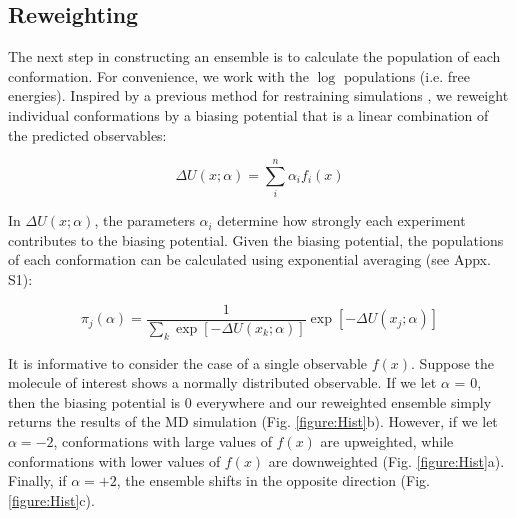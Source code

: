 \documentclass[journal=jacsat,manuscript=article]{achemso}
\begin{document}
\subsection{Reweighting}

The next step in constructing an ensemble is to calculate the population of each conformation.  For convenience, we work with the $\log$ populations (i.e. free energies). Inspired by a previous method for restraining simulations \cite{chodera2012}, we reweight individual conformations by a biasing potential that is a linear combination of the predicted observables:

$$\Delta U(x;\alpha) = \sum_i^n \alpha_i f_i(x)$$

In $\Delta U(x;\alpha)$, the parameters $\alpha_i$ determine how strongly each experiment contributes to the biasing potential.  Given the biasing potential, the populations of each conformation can be calculated using exponential averaging (see Appx. S1):

$$\pi_j(\alpha) = \frac{1}{\sum_k \exp[-\Delta U(x_k;\alpha)]} \exp[-\Delta U(x_j;\alpha)]$$

It is informative to consider the case of a single observable $f(x)$.  Suppose the molecule of interest shows a normally distributed observable.  If we let $\alpha$ = 0, then the biasing potential is $0$ everywhere and our reweighted ensemble simply returns the results of the MD simulation (Fig. \ref{figure:Hist}b).  However, if we let $\alpha = -2$, conformations with large values of $f(x)$ are upweighted, while conformations with lower values of $f(x)$ are downweighted (Fig. \ref{figure:Hist}a).  Finally, if $\alpha = +2$, the ensemble shifts in the opposite direction (Fig. \ref{figure:Hist}c).  
\end{document}
